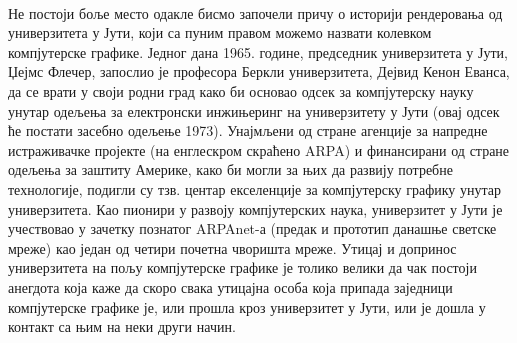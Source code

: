 \documentclass[12pt]{article}
\begin{document}
	\paragraph{}
	Не постоји боље место одакле бисмо започели причу о историји рендеровања од универзитета у Јути, који са пуним правом можемо назвати колевком компјутерске графике. Једног дана 1965. године, председник универзитета у Јути, Џејмс Флечер, запослио је професора Беркли универзитета, Дејвид Кенон Еванса, да се врати у своји родни град како би основао одсек за компјутерску науку унутар одељења за електронски инжињеринг на универзитету у Јути (овај одсек ће постати засебно одељење 1973). Унајмљени од стране агенције за напредне истраживачке пројекте (на енглескром скраћено ARPA) и финансирани од стране одељења за заштиту Америке, како би могли за њих да развију потребне технологије, подигли су тзв. центар екселенције за компјутерску графику унутар универзитета. Као пионири у развоју компјутерских наука, универзитет у Јути је учествовао у зачетку познатог ARPAnet-а (предак и прототип данашње светске мреже) као један од четири почетна чворишта мреже. Утицај и допринос универзитета на пољу компјутерске графике је толико велики да чак постоји анегдота која каже да скоро свака утицајна особа која припада заједници компјутерске графике је, или прошла кроз универзитет у Јути, или је дошла у контакт са њим на неки други начин.
	
\end{document}

